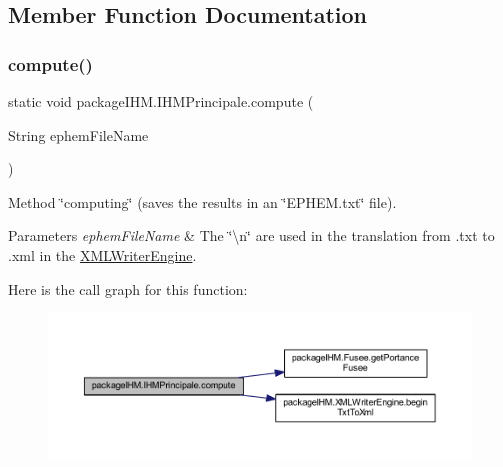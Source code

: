 \subsection{Member Function Documentation}
\mbox{\label{classpackage_i_h_m_1_1_i_h_m_principale_a95db31bde64c587e7d75431b31a86be1}} 
\subsubsection{\texorpdfstring{compute()}{compute()}}
{\footnotesize\ttfamily static void package\+I\+H\+M.\+I\+H\+M\+Principale.\+compute (\begin{DoxyParamCaption}\item[{String}]{ephem\+File\+Name }\end{DoxyParamCaption})\hspace{0.3cm}{\ttfamily [static]}}

Method \char`\"{}computing\char`\"{} (saves the results in an \char`\"{}\+E\+P\+H\+E\+M.\+txt\char`\"{} file). 
\begin{DoxyParams}{Parameters}
{\em ephem\+File\+Name} & The \char`\"{}\textbackslash{}n\char`\"{} are used in the translation from .txt to .xml in the \mbox{\hyperlink{classpackage_i_h_m_1_1_x_m_l_writer_engine}{X\+M\+L\+Writer\+Engine}}.\\
\hline
\end{DoxyParams}
Here is the call graph for this function\+:
\nopagebreak
\begin{figure}[H]
\begin{center}
\leavevmode
\includegraphics[width=350pt]{classpackage_i_h_m_1_1_i_h_m_principale_a95db31bde64c587e7d75431b31a86be1_cgraph}
\end{center}
\end{figure}


